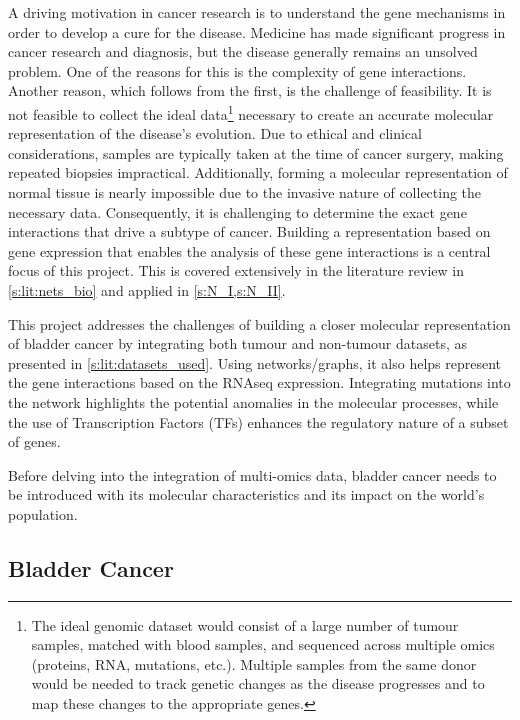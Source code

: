 A driving motivation in cancer research is to understand the gene mechanisms in order to develop a cure for the disease. Medicine has made significant progress in cancer research and diagnosis, but the disease generally remains an unsolved problem. One of the reasons for this is the complexity of gene interactions. Another reason, which follows from the first, is the challenge of feasibility. It is not feasible to collect the ideal data\footnote{The ideal genomic dataset would consist of a large number of tumour samples, matched with blood samples, and sequenced across multiple omics (proteins, RNA, mutations, etc.). Multiple samples from the same donor would be needed to track genetic changes as the disease progresses and to map these changes to the appropriate genes.} necessary to create an accurate molecular representation of the disease's evolution. Due to ethical and clinical considerations, samples are typically taken at the time of cancer surgery, making repeated biopsies impractical. Additionally, forming a molecular representation of normal tissue is nearly impossible due to the invasive nature of collecting the necessary data. Consequently, it is challenging to determine the exact gene interactions that drive a subtype of cancer. Building a representation based on gene expression that enables the analysis of these gene interactions is a central focus of this project. This is covered extensively in the literature review in \cref{s:lit:nets_bio} and applied in \cref{s:N_I,s:N_II}.


This project addresses the challenges of building a closer molecular representation of bladder cancer by integrating both tumour and non-tumour datasets, as presented in \cref{s:lit:datasets_used}. Using networks/graphs, it also helps represent the gene interactions based on the RNAseq expression. Integrating mutations into the network highlights the potential anomalies in the molecular processes, while the use of Transcription Factors (TFs) enhances the regulatory nature of a subset of genes.

Before delving into the integration of multi-omics data, bladder cancer needs to be introduced with its molecular characteristics and its impact on the world's population.


\subsection{Bladder Cancer} \label{s:lit:bladder_cancer}

